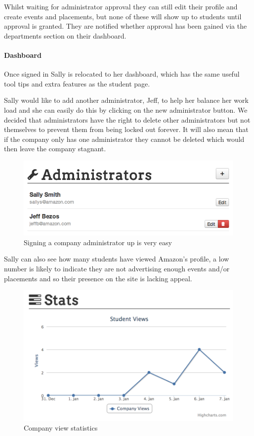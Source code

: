     Whilst waiting for administrator approval they can still edit their profile and create events and placements, but none of these will show up to students until approval is granted. They are notified whether approval has been gained via the departments section on their dashboard.

  \paragraph{Dashboard}
    Once signed in Sally is relocated to her dashboard, which has the same useful tool tips and extra features as the student page.

    Sally would like to add another administrator, Jeff, to help her balance her work load and she can easily do this by clicking on the new administrator button. We decided that administrators have the right to delete other administrators but not themselves to prevent them from being locked out forever. It will also mean that if the company only has one administrator they cannot be deleted which would then leave the company stagnant.

    \begin{figure}[H]\centering
    \includegraphics[scale=0.5]{images/user_experiences/company/jeff_admin}
    \caption{Signing a company administrator up is very easy}
    \end{figure}

    Sally can also see how many students have viewed Amazon's profile, a low number is likely to indicate they are not advertising enough events and/or placements and so their presence on the site is lacking appeal.

    \begin{figure}[H]\centering
    \includegraphics[scale=0.5]{images/user_experiences/company/stats}
    \caption{Company view statistics}
    \end{figure}

